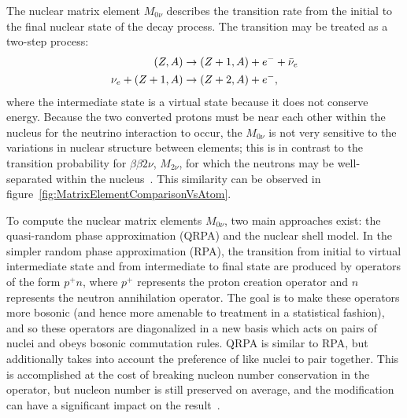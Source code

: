 The nuclear matrix element $M_{0\nu}$ describes the transition rate from the initial to the final nuclear state of the decay process.  The transition may be treated as a two-step process:
\begin{align}
(Z,A) &\rightarrow (Z+1,A) + e^{-} + \bar{\nu}_e \notag \\
\nu_e + (Z+1,A) &\rightarrow (Z+2,A) + e^{-},
\end{align}
where the intermediate state is a virtual state because it does not conserve energy.  Because the two converted protons must be near each other within the nucleus for the neutrino interaction to occur, the $M_{0\nu}$ is not very sensitive to the variations in nuclear structure between elements; this is in contrast to the transition probability for $\beta\beta 2\nu$, $M_{2\nu}$, for which the neutrons may be well-separated within the nucleus~\cite{PetrVogel0nuAnd2nuMatrixElements}.  This similarity can be observed in figure~\ref{fig:MatrixElementComparisonVsAtom}.


To compute the nuclear matrix elements $M_{0\nu}$, two main approaches exist: the quasi-random phase approximation (QRPA) and the nuclear shell model.  In the simpler random phase approximation (RPA), the transition from initial to virtual intermediate state and from intermediate to final state are produced by operators of the form $p^+ n$, where $p^+$ represents the proton creation operator and $n$ represents the neutron annihilation operator.  The goal is to make these operators more bosonic (and hence more amenable to treatment in a statistical fashion), and so these operators are diagonalized in a new basis which acts on pairs of nuclei and obeys bosonic commutation rules.  QRPA is similar to RPA, but additionally takes into account the preference of like nuclei to pair together.  This is accomplished at the cost of breaking nucleon number conservation in the operator, but nucleon number is still preserved on average, and the modification can have a significant impact on the result~\cite{RMPbb0n}.

